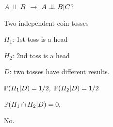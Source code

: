 \documentclass[fleqn,aspectratio=169]{beamer}
\begin{document}
\begin{frame}{$A \perp \!\!\! \perp B$ $\rightarrow$  $A \perp \!\!\! \perp B | C$?}

\plitemsep 0.2in
\bci 

\item<1-> Two independent coin tosses

\plitemsep 0.05in
\bci
\item $H_1$: 1st toss is a head
\item $H_2$: 2nd toss is a head
\item $D$: two tosses have different results.
\eci

\item<2-> $\mathbb{P}( H_1 | D ) = 1/2,$ $\mathbb{P}( H_2 | D ) = 1/2$  


\item<3-> $\mathbb{P}( H_1 \cap H_2 | D ) = 0,$  

\item<3-> No.
\eci 
\end{frame}
\end{document}
